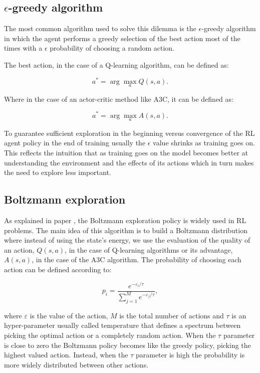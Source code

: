 \subsection{$\epsilon$-greedy algorithm}
\noindent The most common algorithm used to solve this dilemma is the $\epsilon$-greedy algorithm in which the agent performs a greedy selection of the best action most of the times with a $\epsilon$ probability of choosing a random action.

The best action, in the case of a Q-learning algorithm, can be defined as:

\begin{equation}
    a^* =\arg\max\limits_{a} Q(s, a).
\end{equation}

Where in the case of an actor-critic method like A3C, it can be defined as:

\begin{equation}
    a^* =\arg\max\limits_{a} A(s, a).
\end{equation}

To guarantee sufficient exploration in the beginning versus convergence of the \acrshort{RL} agent policy in the end of training usually the $\epsilon$ value shrinks as training goes on. This reflects the intuition that as training goes on the model becomes better at understanding the environment and the effects of its actions which in turn makes the need to explore less important.

\subsection{Boltzmann exploration}
\noindent As explained in paper \cite{boltz}, the Boltzmann exploration policy is widely used in \acrshort{RL} problems. The main idea of this algorithm is to build a Boltzmann distribution where instead of using the state's energy, we use the evaluation of the quality of an action, $Q(s,a)$, in the case of Q-learning algorithms or its advantage, $A(s,a)$, in the case of the \acrshort{A3C} algorithm. The probability of choosing each action can be defined according to:

\begin{equation}
    p_i = \frac{e^{-\varepsilon_i/\tau}}{\sum\limits_{j=1}^M e^{-\varepsilon_j/\tau}},
\end{equation}

where $\varepsilon$ is the value of the action, $M$ is the total number of actions and $\tau$ is an hyper-parameter usually called temperature that defines a spectrum between picking the optimal action or a completely random action. When the $\tau$ parameter is close to zero the Boltzmann policy becomes like the greedy policy, picking the highest valued action. Instead, when the $\tau$ parameter is high the probability is more widely distributed between other actions. 


